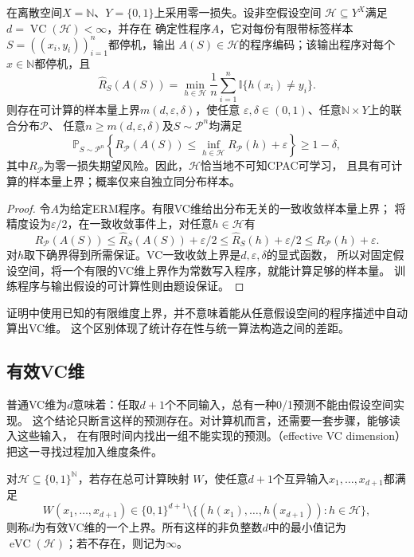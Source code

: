 \begin{theorem}[可计算ERM给出的学习保证]
\label{thm:computable-erm-pac}
在离散空间$X=\mathbb N$、$Y=\{0,1\}$上采用零一损失。设非空假设空间
$\mathcal H\subseteq Y^X$满足$d=\operatorname{VC}(\mathcal H)<\infty$，并存在
确定性程序$A$，它对每份有限带标签样本$S=((x_i,y_i))_{i=1}^n$都停机，输出
$A(S)\in\mathcal H$的程序编码；该输出程序对每个$x\in\mathbb N$都停机，且
\[
 \hat R_S(A(S))
 =\min_{h\in\mathcal H}\frac1n\sum_{i=1}^n\mathbb I\{h(x_i)\neq y_i\}.
\]
则存在可计算的样本量上界$m(d,\varepsilon,\delta)$，使任意
$\varepsilon,\delta\in(0,1)$、任意$\mathbb N\times Y$上的联合分布$\mathcal P$、
任意$n\geq m(d,\varepsilon,\delta)$及$S\sim\mathcal P^n$均满足
\[
 \mathbb P_{S\sim\mathcal P^n}\left\{
 R_{\mathcal P}(A(S))
 \leq\inf_{h\in\mathcal H}R_{\mathcal P}(h)+\varepsilon
 \right\}\geq1-\delta,
\]
其中$R_{\mathcal P}$为零一损失期望风险。因此，$\mathcal H$恰当地不可知CPAC可学习，
且具有可计算的样本量上界；概率仅来自独立同分布样本。
\end{theorem}

\begin{proof}
令$A$为给定ERM程序。有限VC维给出分布无关的一致收敛样本量上界；
将精度设为$\varepsilon/2$，在一致收敛事件上，对任意$h\in\mathcal H$有
\[
 R_{\mathcal P}(A(S))
 \leq\hat R_S(A(S))+\varepsilon/2
 \leq\hat R_S(h)+\varepsilon/2
 \leq R_{\mathcal P}(h)+\varepsilon.
\]
对$h$取下确界得到所需保证。VC一致收敛上界是$d,\varepsilon,\delta$的显式函数，
所以对固定假设空间，将一个有限的VC维上界作为常数写入程序，就能计算足够的样本量。
训练程序与输出假设的可计算性则由题设保证。
\end{proof}

证明中使用已知的有限维度上界，并不意味着能从任意假设空间的程序描述中自动算出VC维。
这个区别体现了统计存在性与统一算法构造之间的差距。

\subsection{有效VC维}

普通VC维为$d$意味着：任取$d+1$个不同输入，总有一种0/1预测不能由假设空间实现。
这个结论只断言这样的预测存在。对计算机而言，还需要一套步骤，能够读入这些输入，
在有限时间内找出一组不能实现的预测。（effective VC dimension）
把这一寻找过程加入维度条件。

\begin{definition}[有效VC维]
\label{def:effective-vc-dimension}
对$\mathcal H\subseteq\{0,1\}^{\mathbb N}$，若存在总可计算映射
$W$，使任意$d+1$个互异输入$x_1,\ldots,x_{d+1}$都满足
\[
 W(x_1,\ldots,x_{d+1})\in\{0,1\}^{d+1}
 \setminus\{(h(x_1),\ldots,h(x_{d+1})):h\in\mathcal H\},
\]
则称$d$为有效VC维的一个上界。所有这样的非负整数$d$中的最小值记为
$\operatorname{eVC}(\mathcal H)$；若不存在，则记为$\infty$。
\end{definition}

